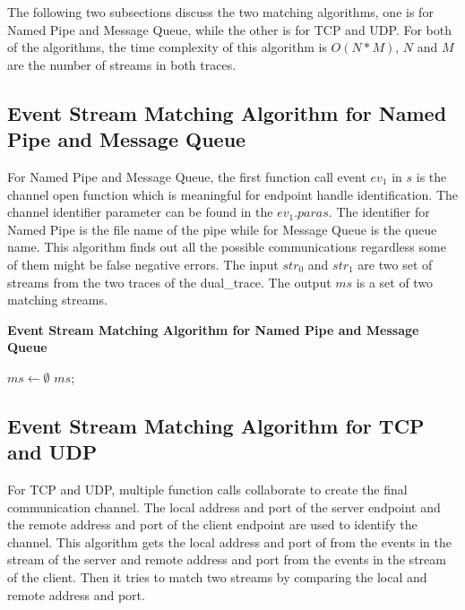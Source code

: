 The following two subsections discuss the two matching algorithms, one is for Named Pipe and Message Queue, while the other is for TCP and UDP. For both of the algorithms, the time complexity of this algorithm is $O(N*M)$, $N$ and $M$ are the number of streams in both traces.

\subsection{Event Stream Matching Algorithm for Named Pipe and Message Queue}
For Named Pipe and Message Queue, the first function call event $ev_1$ in $s$ is the channel open function which is meaningful for endpoint handle identification. The channel identifier parameter can be found in the $ev_1.paras$. The identifier for Named Pipe is the file name of the pipe while for Message Queue is the queue name. This algorithm finds out all the possible communications regardless some of them might be false negative errors. The input $str_0$ and $str_1$ are two set of streams from the two traces of the dual\_trace. The output $ms$ is a set of two matching streams.

\begin{algorithm}[H]
\DontPrintSemicolon
\caption{{\bf Event Stream Matching Algorithm for Named Pipe and Message Queue} \label{matchAlg1}}
$ms \leftarrow \emptyset$\; 
\KwRet $ms$;\;
\end{algorithm} 

\subsection{Event Stream Matching Algorithm for TCP and UDP}
For TCP and UDP, multiple function calls collaborate to create the final communication channel. The local address and port of the server endpoint and the remote address and port of the client endpoint are used to identify the channel. This algorithm gets the local address and port of from the events in the stream of the server and remote address and port from the events in the stream of the client. Then it tries to match two streams by comparing the local and remote address and port. 

